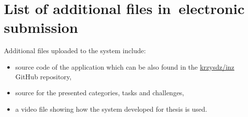 \chapter{List of additional files in~electronic submission}


Additional files uploaded to the system include:
\begin{itemize}
\item source code of the application which can be also found in the \href{https://github.com/krzysdz/inz}{krzysdz/inz} GitHub repository,
\item source for the presented categories, tasks and challenges,
\item a video file showing how the system developed for thesis is used.
\end{itemize}
